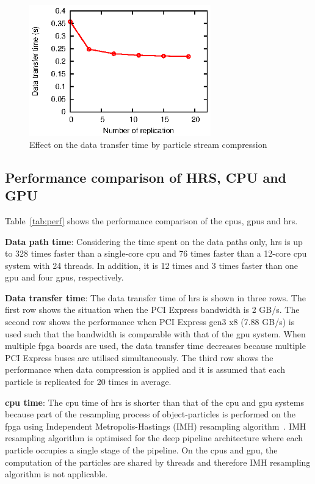 \begin{figure}[t!]
\centering
\includegraphics[width=0.7\textwidth]{4_adaptation/figures/fig_compression}
\caption{Effect on the data transfer time by particle stream compression}
\label{fig:compression}
\end{figure}

\subsection{Performance comparison of HRS, CPU and GPU}
Table~\ref{tab:perf} shows the performance comparison of the \gls{cpu}s, \gls{gpu}s and \gls{hrs}.

\textbf{Data path time}: Considering the time spent on the data paths only, \gls{hrs} is up to 328 times faster than a single-core \gls{cpu} and 76 times faster than a 12-core \gls{cpu} system with 24 threads.
In addition, it is 12 times and 3 times faster than one \gls{gpu} and four \gls{gpu}s, respectively.

\textbf{Data transfer time}: The data transfer time of \gls{hrs} is shown in three rows.
The first row shows the situation when the PCI Express bandwidth is 2 GB/s.
The second row shows the performance when PCI Express gen3 x8 (7.88 GB/s) is used such that the bandwidth is comparable with that of the \gls{gpu} system.
When multiple \gls{fpga} boards are used, the data transfer time decreases because multiple PCI Express buses are utilised simultaneously.
The third row shows the performance when data compression is applied and it is assumed that each particle is replicated for 20 times in average.

\textbf{\gls{cpu} time}: The \gls{cpu} time of \gls{hrs} is shorter than that of the \gls{cpu} and \gls{gpu} systems because part of the resampling process of object-particles is performed on the \gls{fpga} using Independent Metropolis-Hastings (IMH) resampling algorithm~\cite{miao11}.
IMH resampling algorithm is optimised for the deep pipeline architecture where each particle occupies a single stage of the pipeline.
On the \gls{cpu}s and \gls{gpu}, the computation of the particles are shared by threads and therefore IMH resampling algorithm is not applicable.

